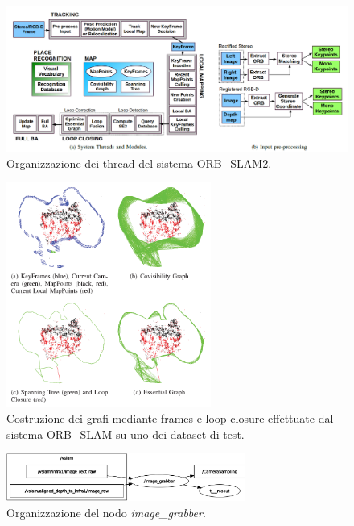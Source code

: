 \begin{figure}
    \centering
    \includegraphics[width=\textwidth]{figs/chapter3/orbthreads.png}
    \caption{Organizzazione dei thread del sistema ORB\_SLAM2.}
    \label{fig:orbthreads}
\end{figure}

\begin{figure}
    \centering
    \includegraphics[width=0.6\textwidth]{figs/chapter3/orbgraphs.png}
    \caption{Costruzione dei grafi mediante frames e loop closure effettuate dal sistema ORB\_SLAM su uno dei dataset di test.}
    \label{fig:orbgraphs}
\end{figure}
\clearpage

\begin{figure}
    \centering
    \includegraphics[width=0.7\textwidth]{figs/chapter3/imagegrabber.png}
    \caption{Organizzazione del nodo \emph{image\_grabber}.}
    \label{fig:imgrabber}
\end{figure}

